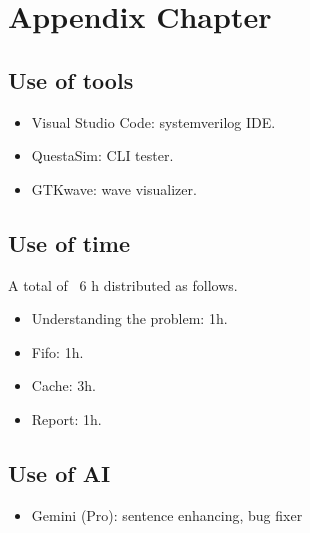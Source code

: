 \appendix
\chapter{Appendix Chapter}

\section{Use of tools}

\begin{itemize}
    \item Visual Studio Code: systemverilog IDE.
    \item QuestaSim: CLI tester.
    \item GTKwave: wave visualizer.
\end{itemize}

\section{Use of time}

A total of ~6 h distributed as follows.

\begin{itemize}
    \item Understanding the problem: 1h.
    \item Fifo: 1h.
    \item Cache: 3h.
    \item Report: 1h.
\end{itemize}

\section{Use of AI}

\begin{itemize}
    \item Gemini (Pro): sentence enhancing, bug fixer
\end{itemize}
